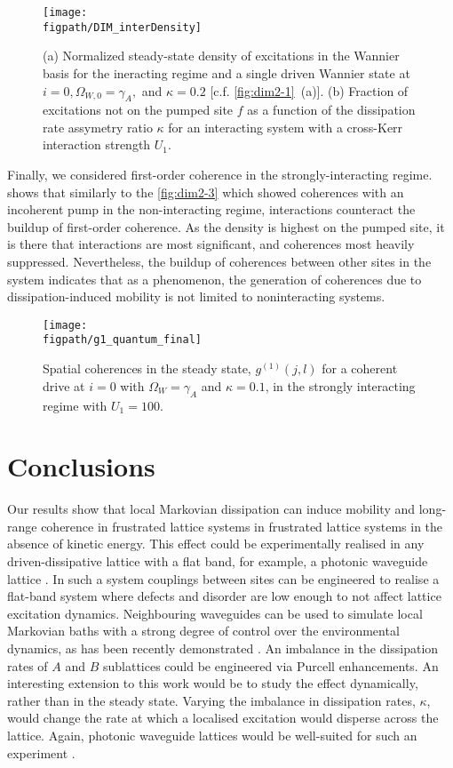 \begin{figure}[ht!]
\centering 
\texttt{[image: \\figpath/DIM\_interDensity]}
\caption{\label{fig:dim3-2}(a) Normalized steady-state density of excitations in the Wannier basis for the ineracting regime and a single driven Wannier state at \(i=0, \Omega_{W,0} = \gamma_{A},\) and \(\kappa = 0.2\) [c.f. \cref{fig:dim2-1}~(a)]. (b) Fraction of excitations not on the pumped site \(f\) as a function of the dissipation rate assymetry ratio \(\kappa\) for an interacting system with a cross-Kerr interaction strength \(U_{1}\).}
\end{figure}

Finally, we considered first-order coherence in the strongly-interacting regime.  shows that similarly to the \cref{fig:dim2-3} which showed coherences with an incoherent pump in the non-interacting regime, interactions counteract the buildup of first-order coherence. As the density is highest on the pumped site, it is there that interactions are most significant, and coherences most heavily suppressed. Nevertheless, the buildup of coherences between other sites in the system indicates that as a phenomenon, the generation of coherences due to dissipation-induced mobility is not limited to noninteracting systems.

\begin{figure}[ht!]
\centering 
\texttt{[image: \\figpath/g1\_quantum\_final]}
\caption{\label{fig:dim3-3}Spatial coherences in the steady state, \(g^{(1)}(j,l)\) for a coherent drive at \(i=0\) with \(\Omega_{W} = \gamma_{A}\) and \(\kappa = 0.1\), in the strongly interacting regime with \(U_{1} = 100\).}
\end{figure}

\section{Conclusions}
Our results show that local Markovian dissipation can induce mobility and long-range coherence in frustrated lattice systems in frustrated lattice systems in the absence of kinetic energy. This effect could be experimentally realised in any driven-dissipative lattice with a flat band, for example, a photonic waveguide lattice \cite{Mukherjee2015}. In such a system couplings between sites can be engineered to realise a flat-band system where defects and disorder are low enough to not affect lattice excitation dynamics. Neighbouring waveguides can be used to simulate local Markovian baths with a strong degree of control over the environmental dynamics, as has been recently demonstrated \cite{Mukherjee2017}. An imbalance in the dissipation rates of \(A\) and \(B\) sublattices could be engineered via Purcell enhancements. An interesting extension to this work would be to study the effect dynamically, rather than in the steady state. Varying the imbalance in dissipation rates, \(\kappa\), would change the rate at which a localised excitation would disperse across the lattice. Again, photonic waveguide lattices would be well-suited for such an experiment \cite{Mukherjee2015}. 

